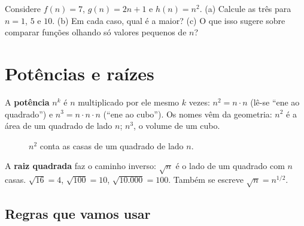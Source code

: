 \begin{exrapido}
Considere $f(n) = 7$, $g(n) = 2n + 1$ e $h(n) = n^2$. (a) Calcule as três para $n = 1$, $5$ e
$10$. (b) Em cada caso, qual é a maior? (c) O que isso sugere sobre comparar funções olhando só
valores pequenos de $n$?
\end{exrapido}

\section{Potências e raízes}

A \textbf{potência} $n^k$ é $n$ multiplicado por ele mesmo $k$ vezes: $n^2 = n \cdot n$ (lê-se
\enquote{ene ao quadrado}) e $n^3 = n \cdot n \cdot n$ (\enquote{ene ao cubo}). Os nomes vêm da
geometria: $n^2$ é a área de um quadrado de lado $n$; $n^3$, o volume de um cubo.

\begin{figure}[!htb]
\centering
{}
\caption{$n^2$ conta as casas de um quadrado de lado $n$.}
\end{figure}

A \textbf{raiz quadrada} faz o caminho inverso: $\sqrt{n}$ é o lado de um quadrado com $n$ casas.
$\sqrt{16} = 4$, $\sqrt{100} = 10$, $\sqrt{10.000} = 100$. Também se escreve $\sqrt{n} = n^{1/2}$.

\subsection{Regras que vamos usar}

